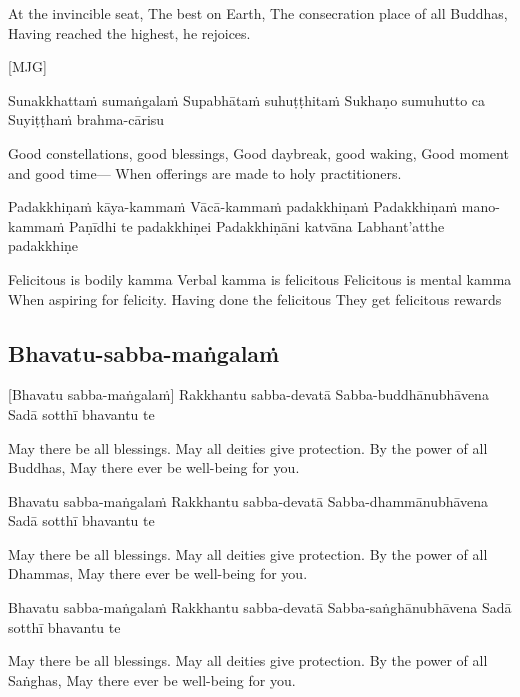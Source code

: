 \begin{english}
  At the invincible seat,
  The best on Earth,
  The consecration place of all Buddhas,
  Having reached the highest, he rejoices.
\end{english}

[MJG]

Sunakkhattaṁ sumaṅgalaṁ
Supabhātaṁ suhuṭṭhitaṁ
Sukhaṇo sumuhutto ca
Suyiṭṭhaṁ brahma-cārisu

\begin{english}
  Good constellations, good blessings,
  Good daybreak, good waking,
  Good moment and good time—
  When offerings are made to holy practitioners.
\end{english}

Padakkhiṇaṁ kāya-kammaṁ
Vācā-kammaṁ padakkhiṇaṁ
Padakkhiṇaṁ mano-kammaṁ
Paṇīdhi te padakkhiṇei
Padakkhiṇāni katvāna
Labhant’atthe padakkhiṇe

\begin{english}
  Felicitous is bodily kamma
  Verbal kamma is felicitous
  Felicitous is mental kamma
  When aspiring for felicity.
  Having done the felicitous
  They get felicitous rewards
\end{english}

\suttaRef{[AN 3.155]}

\subsection{Bhavatu-sabba-maṅgalaṁ}
[Bhavatu sabba-maṅgalaṁ]
Rakkhantu sabba-devatā
Sabba-buddhānubhāvena
Sadā sotthī bhavantu te

\begin{english}
  May there be all blessings.
  May all deities give protection.
  By the power of all Buddhas,
  May there ever be well-being for you.
\end{english}

Bhavatu sabba-maṅgalaṁ
Rakkhantu sabba-devatā
Sabba-dhammānubhāvena
Sadā sotthī bhavantu te

\begin{english}
  May there be all blessings.
  May all deities give protection.
  By the power of all Dhammas,
  May there ever be well-being for you.
\end{english}

Bhavatu sabba-maṅgalaṁ
Rakkhantu sabba-devatā
Sabba-saṅghānubhāvena
Sadā sotthī bhavantu te

\begin{english}
  May there be all blessings.
  May all deities give protection.
  By the power of all Saṅghas,
  May there ever be well-being for you.
\end{english}

\suttaRef{[Trad]}
